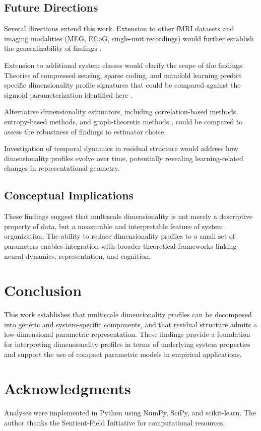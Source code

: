 \documentclass[11pt]{article}
\begin{document}
\subsection{Future Directions}

Several directions extend this work. Extension to other fMRI datasets and imaging modalities (MEG, ECoG, single-unit recordings) would further establish the generalizability of findings \citep{stringer2019high}.

Extension to additional system classes would clarify the scope of the findings. Theories of compressed sensing, sparse coding, and manifold learning predict specific dimensionality profile signatures that could be compared against the sigmoid parameterization identified here \citep{belkin2003laplacian, tenenbaum2000global}.

Alternative dimensionality estimators, including correlation-based methods, entropy-based methods, and graph-theoretic methods \citep{penzel2022spectral}, could be compared to assess the robustness of findings to estimator choice.

Investigation of temporal dynamics in residual structure would address how dimensionality profiles evolve over time, potentially revealing learning-related changes in representational geometry.

\subsection{Conceptual Implications}
These findings suggest that multiscale dimensionality is not merely a descriptive property of data, but a measurable and interpretable feature of system organization. The ability to reduce dimensionality profiles to a small set of parameters enables integration with broader theoretical frameworks linking neural dynamics, representation, and cognition.

\section{Conclusion}

This work establishes that multiscale dimensionality profiles can be decomposed into generic and system-specific components, and that residual structure admits a low-dimensional parametric representation. These findings provide a foundation for interpreting dimensionality profiles in terms of underlying system properties and support the use of compact parametric models in empirical applications.

\section*{Acknowledgments}

Analyses were implemented in Python using NumPy, SciPy, and scikit-learn. The author thanks the Sentient-Field Initiative for computational resources.



\end{document}
